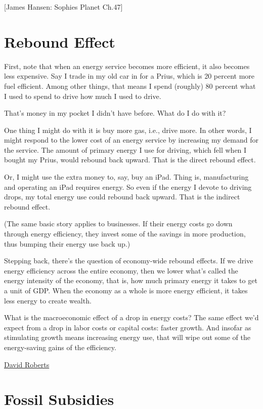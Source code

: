 \documentclass[
]{book}
\begin{document}
{[}James Hansen: Sophies Planet Ch.47{]}

\hypertarget{rebound-effect-1}{%
\chapter{Rebound Effect}\label{rebound-effect-1}}

First, note that when an energy service becomes more efficient, it also becomes less expensive. Say I trade in my old car in for a Prius, which is 20 percent more fuel efficient. Among other things, that means I spend (roughly) 80 percent what I used to spend to drive how much I used to drive.

That's money in my pocket I didn't have before. What do I do with it?

One thing I might do with it is buy more gas, i.e., drive more. In other words, I might respond to the lower cost of an energy service by increasing my demand for the service. The amount of primary energy I use for driving, which fell when I bought my Prius, would rebound back upward. That is the direct rebound effect.

Or, I might use the extra money to, say, buy an iPad. Thing is, manufacturing and operating an iPad requires energy. So even if the energy I devote to driving drops, my total energy use could rebound back upward. That is the indirect rebound effect.

(The same basic story applies to businesses. If their energy costs go down through energy efficiency, they invest some of the savings in more production, thus bumping their energy use back up.)

Stepping back, there's the question of economy-wide rebound effects. If we drive energy efficiency across the entire economy, then we lower what's called the energy intensity of the economy, that is, how much primary energy it takes to get a unit of GDP. When the economy as a whole is more energy efficient, it takes less energy to create wealth.

What is the macroeconomic effect of a drop in energy costs? The same effect we'd expect from a drop in labor costs or capital costs: faster growth. And insofar as stimulating growth means increasing energy use, that will wipe out some of the energy-saving gains of the efficiency.

\href{https://grist.org/energy-efficiency/whats-the-deal-with-the-rebound-effect/}{David Roberts}

\hypertarget{fossil-subsidies}{%
\chapter{Fossil Subsidies}\label{fossil-subsidies}}
\end{document}
